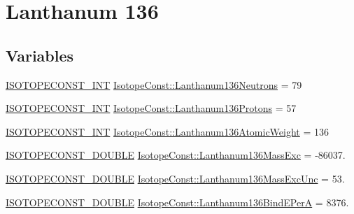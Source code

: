 \hypertarget{group___isotope_const-_lanthanum-_la136}{}\section{Lanthanum 136}
\label{group___isotope_const-_lanthanum-_la136}
\subsection*{Variables}
\begin{DoxyCompactItemize}
\item 
\mbox{\hyperlink{group___isotope_const-_macros_ga5f18360b3e99483a35c32d789e62621c}{I\+S\+O\+T\+O\+P\+E\+C\+O\+N\+S\+T\+\_\+\+I\+NT}} \mbox{\hyperlink{group___isotope_const-_lanthanum-_la136_ga98da42457a63575a96bf86f9a6e95060}{Isotope\+Const\+::\+Lanthanum136\+Neutrons}} = 79
\item 
\mbox{\hyperlink{group___isotope_const-_macros_ga5f18360b3e99483a35c32d789e62621c}{I\+S\+O\+T\+O\+P\+E\+C\+O\+N\+S\+T\+\_\+\+I\+NT}} \mbox{\hyperlink{group___isotope_const-_lanthanum-_la136_gaf7fde68eead65b9ff66e74a7043ea2db}{Isotope\+Const\+::\+Lanthanum136\+Protons}} = 57
\item 
\mbox{\hyperlink{group___isotope_const-_macros_ga5f18360b3e99483a35c32d789e62621c}{I\+S\+O\+T\+O\+P\+E\+C\+O\+N\+S\+T\+\_\+\+I\+NT}} \mbox{\hyperlink{group___isotope_const-_lanthanum-_la136_ga26790d01b991d561cc493367d1a28e7f}{Isotope\+Const\+::\+Lanthanum136\+Atomic\+Weight}} = 136
\item 
\mbox{\hyperlink{group___isotope_const-_macros_ga8f45a7272ce02c0b4c65c44636ed719a}{I\+S\+O\+T\+O\+P\+E\+C\+O\+N\+S\+T\+\_\+\+D\+O\+U\+B\+LE}} \mbox{\hyperlink{group___isotope_const-_lanthanum-_la136_ga87dfc8e845eb5d805f3305408940f5b5}{Isotope\+Const\+::\+Lanthanum136\+Mass\+Exc}} = -\/86037.
\item 
\mbox{\hyperlink{group___isotope_const-_macros_ga8f45a7272ce02c0b4c65c44636ed719a}{I\+S\+O\+T\+O\+P\+E\+C\+O\+N\+S\+T\+\_\+\+D\+O\+U\+B\+LE}} \mbox{\hyperlink{group___isotope_const-_lanthanum-_la136_ga11b6186723576c4c11c03351689aae00}{Isotope\+Const\+::\+Lanthanum136\+Mass\+Exc\+Unc}} = 53.
\item 
\mbox{\hyperlink{group___isotope_const-_macros_ga8f45a7272ce02c0b4c65c44636ed719a}{I\+S\+O\+T\+O\+P\+E\+C\+O\+N\+S\+T\+\_\+\+D\+O\+U\+B\+LE}} \mbox{\hyperlink{group___isotope_const-_lanthanum-_la136_gae46181a1ad709f8b033962a7c0e40152}{Isotope\+Const\+::\+Lanthanum136\+Bind\+E\+PerA}} = 8376.
\item 

\end{DoxyCompactItemize}
